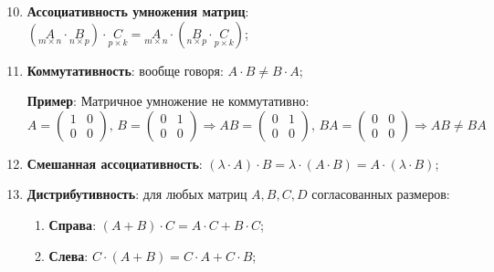 \documentclass[12pt]{article}
\theoremstyle{definition}
\begin{document}
\begin{enumerate}[label=(\arabic*)]
	\setcounter{enumi}{9}
	\item \textbf{Ассоциативность умножения матриц}: $ (\underset{m \times n}{A}{\cdot}\underset{n\times p}{B}){\cdot}\underset{p\times k}{C} =\underset{m \times n}{A}{\cdot}(\underset{n\times p}{B}{\cdot}\underset{p\times k}{C}) $;
	\item \textbf{Коммутативность}: вообще говоря: $A{\cdot}B \neq B{\cdot}A$;

	\textbf{Пример}: Матричное умножение не коммутативно:
	$$
		A = \begin{pmatrix}
			1 & 0 \\
			0 & 0
		\end{pmatrix}, \, B = 
		\begin{pmatrix}
			0 & 1 \\
			0 & 0
		\end{pmatrix} \Rightarrow AB = 
		\begin{pmatrix}
			0 & 1 \\
			0 & 0
		\end{pmatrix}, \, BA = 
		\begin{pmatrix}
			0 & 0\\
			0 & 0
		\end{pmatrix} \Rightarrow AB \neq BA
	$$
	\item \textbf{Смешанная ассоциативность}: $(\lambda{\cdot}A){\cdot}B = \lambda{\cdot}(A{\cdot}B) = A{\cdot}(\lambda{\cdot}B)$;
	
	\item \textbf{Дистрибутивность}: для любых матриц $A,B,C,D$ согласованных размеров:
	\begin{enumerate}[label=(\alph*)]
		\item \textbf{Справа}: $(A + B){\cdot}C = A{\cdot}C + B{\cdot}C$;
		\item \textbf{Слева}: $C{\cdot}(A + B) = C{\cdot}A + C{\cdot}B$;
	\end{enumerate}
\end{enumerate}
\end{document}
